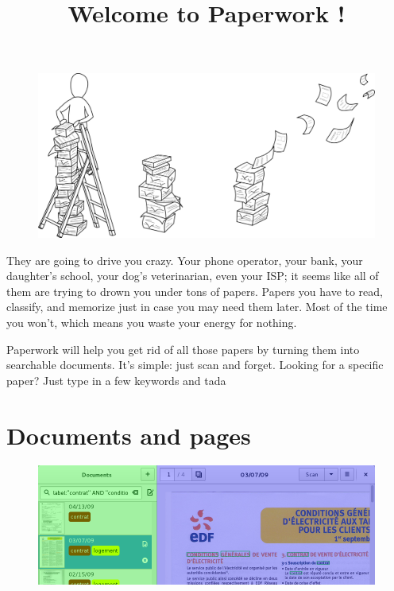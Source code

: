 \documentclass[10pt,a4paper]{article}
\date{}
\title{Welcome to Paperwork !}
\begin{document}
\maketitle

\begin{figure}[h]
	\includegraphics[width=\linewidth]{data/intro.png}
\end{figure}

They are going to drive you crazy. Your phone operator, your bank, your daughter's school, your dog's veterinarian, even your ISP; it seems like all of them are trying to drown you under tons of papers. Papers you have to read, classify, and memorize just in case you may need them later. Most of the time you won't, which means you waste your energy for nothing.

Paperwork will help you get rid of all those papers by turning them into searchable documents.
It's simple: just scan and forget. Looking for a specific paper?
Just type in a few keywords and tada

\pagebreak

\section{Documents and pages}

\begin{figure}[h]
	\includegraphics[width=\linewidth]{data/paperwork_main_window_split.png}
\end{figure}
\end{document}
